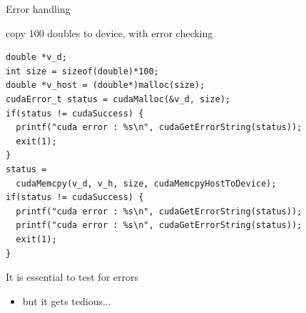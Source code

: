 \documentclass[aspectratio=43]{beamer}
\begin{document}
\begin{frame}[fragile]{Error handling}

    \begin{code}{copy 100 doubles to device, with error checking}
        \begin{lstlisting}[style=boxcuda]
double *v_d;
int size = sizeof(double)*100;
double *v_host = (double*)malloc(size);
cudaError_t status = cudaMalloc(&v_d, size);
if(status != cudaSuccess) {
  printf("cuda error : %s\n", cudaGetErrorString(status));
  exit(1);
}
status =
  cudaMemcpy(v_d, v_h, size, cudaMemcpyHostToDevice);
if(status != cudaSuccess) {
  printf("cuda error : %s\n", cudaGetErrorString(status));
  printf("cuda error : %s\n", cudaGetErrorString(status));
  exit(1);
}
        \end{lstlisting}
    \end{code}

    It is essential to test for errors
    \begin{itemize}
        \item but it gets tedious...
    \end{itemize}
\end{frame}
\end{document}

